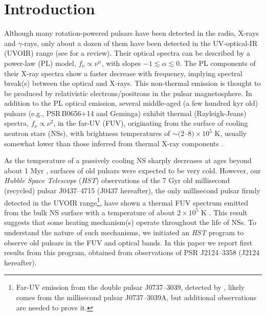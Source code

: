 \documentclass[iop]{emulateapj}
\begin{document}


\section{Introduction}

Although many rotation-powered pulsars have been detected in the radio, X-rays and $\gamma$-rays, only about a dozen of them have been detected in the UV-optical-IR (UVOIR) range (see \citealt{2011AdSpR..47.1281M} for a review). Their optical spectra can be described by a power-law (PL) model, $f_{\nu}\propto\nu^{\alpha}$, with slopes $-1\lesssim \alpha\lesssim 0$. The PL components of their X-ray spectra show a faster decrease with frequency, implying spectral break(s) between the optical and X-rays. This  non-thermal  emission is thought to be produced by relativistic electrons/positrons in the pulsar magnetosphere. In addition to the PL optical emission, several middle-aged (a few hundred kyr old) pulsars (e.g., PSR\,B0656+14 and Geminga) exhibit thermal (Rayleigh-Jeans) spectra, $f_\nu\propto \nu^2$, in the far-UV (FUV), originating from the surface of cooling neutron stars (NSs),  with brightness temperatures of $\sim (2$--$8)\times 10^5$ K, usually somewhat lower than those inferred from thermal X-ray components \citep{2007Ap&SS.308..287K}.

As the temperature of a passively cooling NS sharply decreases at ages beyond about 1 Myr \citep{2004ARA&A..42..169Y}, surfaces of old pulsars were expected to be very cold. However, our {\sl Hubble Space Telescope} ({\sl HST}) observations of the 7 Gyr old millisecond (recycled) pulsar J0437--4715 (J0437 hereafter), the only millisecond pulsar firmly detected in the UVOIR range\footnote{Far-UV emission from the double pulsar J0737--3039, detected by \citet{2014ApJ...783L..22D}, likely comes from the millisecond pulsar J0737--3039A, but additional observations are needed to prove it.},  have shown a thermal FUV spectrum emitted from the bulk NS surface with a temperature of about $2\times 10^5$ K \citep{2004ApJ...602..327K,2012ApJ...746....6D}. This result suggests that some heating mechanism(s) operate throughout the life of NSs. To understand the nature of such mechanisms, we initiated an {\sl HST} program to observe old pulsars in the FUV and optical bands. In this paper we report first results from this program, obtained from observations of PSR J2124--3358 (J2124 hereafter).
 
\end{document}
